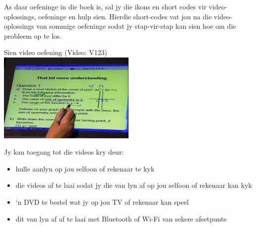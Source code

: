 {\normalsize

As daar oefeninge in die boek is, sal jy die ikons en short codes vir video-oplossings, oefeninge en hulp sien. Hierdie short-codes vat jou na die video-oplossings van sommige oefeninge sodat jy stap-vir-stap kan sien hoe om die probleem op te los. \par

\begin{center}
Sien video oefening  (Video: V123) \\
\includegraphics[width=0.5\textwidth]{title_images/mindsetexercise.png}
\end{center}
\par
Jy kan toegang tot die videos kry deur:
\begin{itemize}
    \item hulle aanlyn op jou selfoon of rekenaar te kyk
    \item die videos af te laai sodat jy die van lyn af op jou selfoon of rekenaar kan kyk
    \item ‘n DVD te bestel wat jy op jou TV of rekenaar kan speel
    \item dit van lyn af af te laai met Bluetooth of Wi-Fi van sekere afsetpunte
\end{itemize}
}


